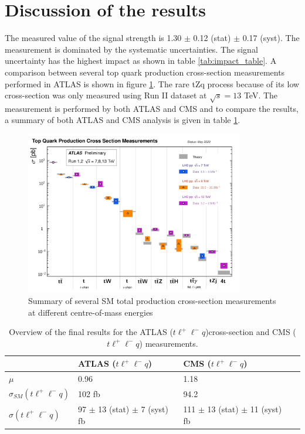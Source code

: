 \section{Discussion of the results}
\label{sec:discussionoftheresults}

The measured value of the signal strength is 1.30 $\pm$ 0.12 (stat) $\pm$ 0.17 (syst). The measurement is dominated by the systematic uncertainties. The signal uncertainty has the highest impact as shown in table \ref{tab:impact_table}. A comparison between several top quark production cross-section measurements performed in ATLAS is shown in figure \ref{fig:summarycross-section}. The rare tZq process because of its low cross-section was only measured using Run II dataset at $\sqrt{s}=13$ TeV. The measurement is performed by both ATLAS and CMS and to compare the results, a summary of both ATLAS and CMS analysis is given in table \ref{tab:summaryofATLASCMSresults}.

\begin{figure}[!h]
    \centering
    \includegraphics[width=0.85\textwidth]{ubonn-thesis/Chapters/Chapters_07/Figure/Summary_cross-section.pdf}
    \caption{Summary of several SM total production cross-section measurements at different centre-of-mass energies \cite{summarycrosssection}}
    \label{fig:summarycross-section}
\end{figure}


\begin{table}[h!]
     \centering
      \begin{tabular}{@{} *4l  @{}}
      \toprule
       & ATLAS ($t \ell^{+}\ell^{-} q$) & CMS ($t \ell^{+}\ell^{-} q$) \\
     \midrule
      $\mu$ & 0.96 & 1.18 \\[0.2ex] 
      $\sigma_{SM}(t \ell^{+}\ell^{-} q)$ & 102 fb & 94.2 \\[0.2ex] 
      $\sigma(t \ell^{+}\ell^{-} q)$ & 97 $\pm$ 13 (stat) $\pm$ 7 (syst) fb& 111 $\pm$ 13 (stat) $\pm$ 11 (syst) fb \\[0.2ex] 
      \bottomrule
 \end{tabular}
 \caption{Overview of the final results for the ATLAS ($t \ell^{+}\ell^{-} q$)cross-section and CMS ($t \ell^{+}\ell^{-} q$) measurements.}
 \label{tab:summaryofATLASCMSresults}
 \end{table}
 


